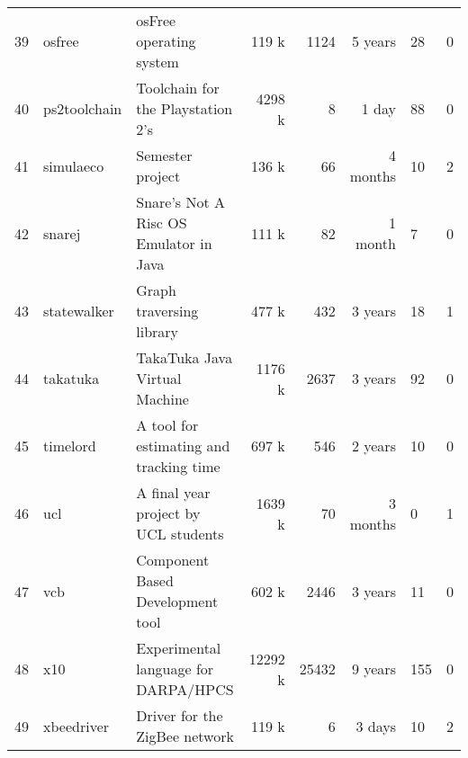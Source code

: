 \begin{table*}[htb]
\begin{tabularx}{\textwidth}{|r|l|l|r|r|r|Y|Y|}
  39 & osfree & osFree operating system & 119 k & 1124 & 5 years &  28 &   0 \\ 
  40 & ps2toolchain & Toolchain for the Playstation 2's & 4298 k &   8 & 1 day &  88 &   0 \\ 
  41 & simulaeco & Semester project & 136 k &  66 & 4 months &  10 &   2 \\ 
  42 & snarej & Snare's Not A Risc OS Emulator in Java & 111 k &  82 & 1 month &   7 &   0 \\ 
  43 & statewalker & Graph traversing library & 477 k & 432 & 3 years &  18 &   1 \\ 
  44 & takatuka & TakaTuka Java Virtual Machine & 1176 k & 2637 & 3 years &  92 &   0 \\ 
  45 & timelord & A tool for estimating and tracking time & 697 k & 546 & 2 years &  10 &   0 \\ 
  46 & ucl & A final year project by UCL students & 1639 k &  70 & 3 months &   0 &   1 \\ 
  47 & vcb & Component Based Development tool & 602 k & 2446 & 3 years &  11 &   0 \\ 
  48 & x10 & Experimental language for DARPA/HPCS & 12292 k & 25432 & 9 years & 155 &   0 \\ 
  49 & xbeedriver & Driver for the ZigBee network & 119 k &   6 & 3 days &  10 &   2 \\ 
   \hline
\end{tabularx}
\end{table*}
